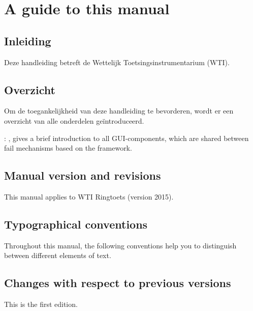 
\chapter{A guide to this manual\label{chap:guide}}

\section{Inleiding}
Deze handleiding betreft de Wettelijk Toetsingsinstrumentarium (WTI).

\section{Overzicht}
Om de toegankelijkheid van deze handleiding te bevorderen, wordt er een overzicht van alle onderdelen geïntroduceerd.

: , gives a brief introduction to all GUI-components, which are shared between fail mechanisms based on the framework.

\section{Manual version and revisions}
This manual applies to WTI Ringtoets (version 2015).

\section{Typographical conventions}
Throughout this manual, the following conventions help you to distinguish between different
elements of text.


\section{Changes with respect to previous versions}
This is the first edition.